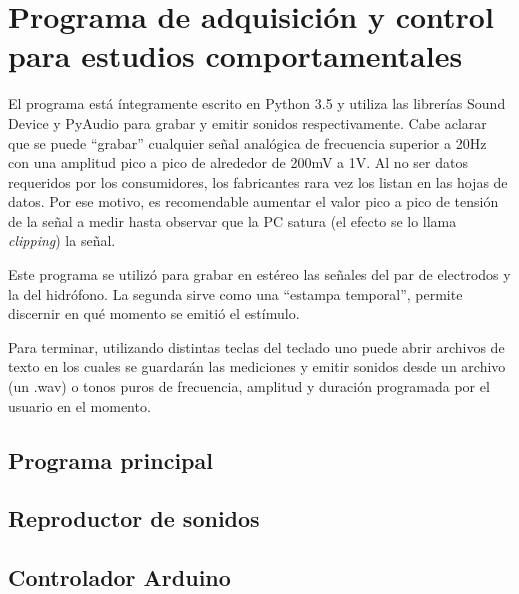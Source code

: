 \chapter{Programa de adquisición y control para estudios comportamentales}
\label{ap:programapython}

El programa está íntegramente escrito en Python 3.5 y utiliza las librerías Sound Device y PyAudio para grabar y emitir sonidos respectivamente. Cabe aclarar que se puede ``grabar'' cualquier señal analógica de frecuencia superior a 20Hz con una amplitud pico a pico de alrededor de 200mV a 1V. Al no ser datos requeridos por los consumidores, los fabricantes rara vez los listan en las hojas de datos. Por ese motivo, es recomendable aumentar el valor pico a pico de tensión de la señal a medir hasta observar que la PC satura (el efecto se lo llama \emph{clipping}) la señal.

Este programa se utilizó para grabar en estéreo las señales del par de electrodos y la del hidrófono. La segunda sirve como una ``estampa temporal'', permite discernir en qué momento se emitió el estímulo.

Para terminar, utilizando distintas teclas del teclado uno puede abrir archivos de texto en los cuales se guardarán las mediciones y emitir sonidos desde un archivo (un .wav) o tonos puros de frecuencia, amplitud y duración programada por el usuario en el momento.

\section{Programa principal}

\section{Reproductor de sonidos}

\section{Controlador Arduino}

